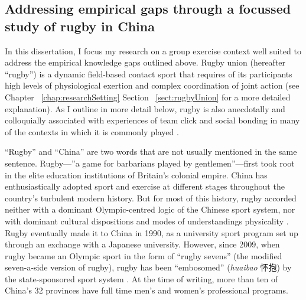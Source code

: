 \begin{CJK}{UTF8}{gbsn}
\section{Addressing empirical gaps through a focussed study of rugby in China}

In this dissertation, I focus my research on a group exercise context well suited to address the empirical knowledge gaps outlined above.  Rugby union (hereafter ``rugby'') is a dynamic field-based contact sport that requires of its participants high levels of physiological exertion and complex coordination of joint action (see Chapter ~\ref{chap:researchSetting} Section ~\ref{sect:rugbyUnion} for a more detailed explanation). As I outline in more detail below, rugby is also anecdotally and colloquially associated with experiences of team click and social bonding in many of the contexts in which it is commonly played \citep{Dunning2005}.

``Rugby'' and ``China'' are two words that are not usually mentioned in the same sentence.  Rugby---''a game for barbarians played by gentlemen''---first took root in the elite education institutions of Britain's colonial empire.  China has enthusiastically adopted sport and exercise at different stages throughout the country's turbulent modern history. But for most of this history, rugby accorded neither with a dominant Olympic-centred logic of the Chinese sport system, nor with dominant cultural dispositions and modes of understandings physicality \citep[derived from Confucian and Daoist traditions of thought, see][]{Morris2004}.  Rugby eventually made it to China in 1990, as a university sport program set up through an exchange with a Japanese university.  However, since 2009, when rugby became an Olympic sport in the form of ``rugby sevens'' (the modified seven-a-side version of rugby), rugby has been ``embosomed'' (\textit{huaibao} 怀抱) by the state-sponsored sport system \citep{Xu2010}.  At the time of writing, more than ten of China's 32 provinces have full time men's and women's professional programs.


\end{CJK}
